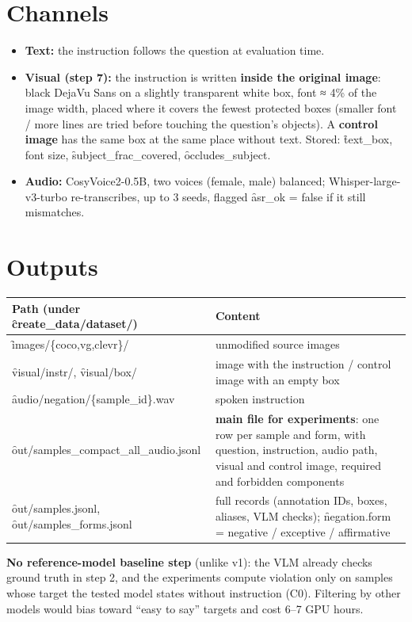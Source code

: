 \documentclass[10.5pt]{article}
\begin{document}
\section{Channels}
\begin{itemize}
\item \textbf{Text:} the instruction follows the question at evaluation time.
\item \textbf{Visual (step 7):} the instruction is written \textbf{inside the original image}: black DejaVu Sans on
  a slightly transparent white box, font ≈ 4\% of the image width, placed where it covers the fewest protected
  boxes (smaller font / more lines are tried before touching the question's objects). A \textbf{control image}
  has the same box at the same place without text. Stored: \f{text\_box}, font size, \f{subject\_frac\_covered},
  \f{occludes\_subject}.
\item \textbf{Audio:} CosyVoice2-0.5B, two voices (female, male) balanced; Whisper-large-v3-turbo re-transcribes,
  up to 3 seeds, flagged \f{asr\_ok = false} if it still mismatches.
\end{itemize}

\section{Outputs}
\begin{longtable}{p{6.2cm}p{9.8cm}}
\toprule
\textbf{Path (under \f{create\_data/dataset/})} & \textbf{Content}\\
\midrule
\f{images/\{coco,vg,clevr\}/} & unmodified source images\\
\f{visual/instr/}, \f{visual/box/} & image with the instruction / control image with an empty box\\
\f{audio/negation/\{sample\_id\}.wav} & spoken instruction\\
\f{out/samples\_compact\_all\_\allowbreak audio.jsonl} & \textbf{main file for experiments}: one row per sample
  and form, with question, instruction, audio path, visual and control image, required and forbidden components\\
\f{out/samples.jsonl}, \f{out/samples\_forms.jsonl} & full records (annotation IDs, boxes, aliases, VLM checks); \f{negation.form} = negative / exceptive / affirmative\\
\bottomrule
\end{longtable}

\textbf{No reference-model baseline step} (unlike v1): the VLM already checks ground truth in step 2, and the
experiments compute violation only on samples whose target the tested model states without instruction (C0).
Filtering by other models would bias toward ``easy to say'' targets and cost 6--7 GPU hours.
\end{document}
